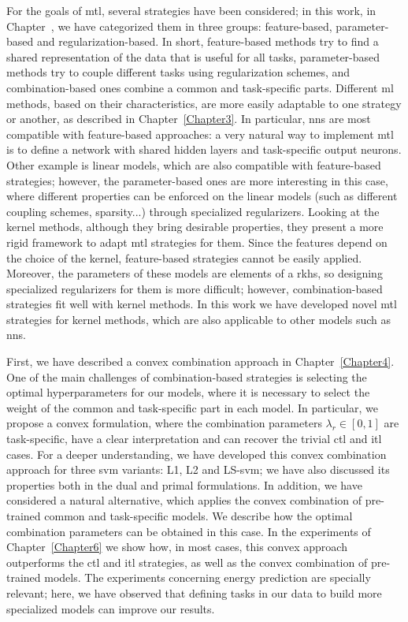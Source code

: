 For the goals of \acrshort{mtl}, several strategies have been considered; in this work, in Chapter~, we have categorized them in three groups: feature-based, parameter-based and regularization-based.
In short, feature-based methods try to find a shared representation of the data that is useful for all tasks, parameter-based methods try to couple different tasks using regularization schemes, and combination-based ones combine a common and task-specific parts.
Different \acrshort{ml} methods, based on their characteristics, are more easily adaptable to one strategy or another, as described in Chapter~\ref{Chapter3}. In particular, \acrfull{nns} are most compatible with feature-based approaches: a very natural way to implement \acrshort{mtl} is to define a network with shared hidden layers and task-specific output neurons.
Other example is linear models, which are also compatible with feature-based strategies; however, the parameter-based ones are more interesting in this case, where different properties can be enforced on the linear models (such as different coupling schemes, sparsity...) through specialized regularizers.
Looking at the kernel methods, although they bring desirable properties, they present a more rigid framework to adapt \acrshort{mtl} strategies for them. Since the features depend on the choice of the kernel, feature-based strategies cannot be easily applied. Moreover, the parameters of these models are elements of a \acrfull{rkhs}, so designing specialized regularizers for them is more difficult; however, combination-based strategies fit well with kernel methods.
%
In this work we have developed novel \acrshort{mtl} strategies for kernel methods, which are also applicable to other models such as \acrshort{nns}.


%
First, we have described a convex combination approach in Chapter~\ref{Chapter4}. One of the main challenges of combination-based strategies is selecting the optimal hyperparameters for our models, where it is necessary to select the weight of the common and task-specific part in each model. In particular, we propose a convex formulation, where the combination parameters $\lambda_r \in [0, 1]$ are task-specific, have a clear interpretation and can recover the trivial \acrshort{ctl} and \acrshort{itl} cases.
%
For a deeper understanding, we have developed this convex combination approach for three \acrshort{svm} variants: L1, L2 and LS-\acrshort{svm}; we have also discussed its properties both in the dual and primal formulations.
%
In addition, we have considered a natural alternative, which applies the convex combination of pre-trained common and task-specific models. We describe how the optimal combination parameters can be obtained in this case.
%
In the experiments of Chapter~\ref{Chapter6} we show how, in most cases, this convex approach outperforms the \acrshort{ctl} and \acrshort{itl} strategies, as well as the convex combination of pre-trained models.
The experiments concerning energy prediction are specially relevant; here, we have observed that defining tasks in our data to build more specialized models can improve our results.

